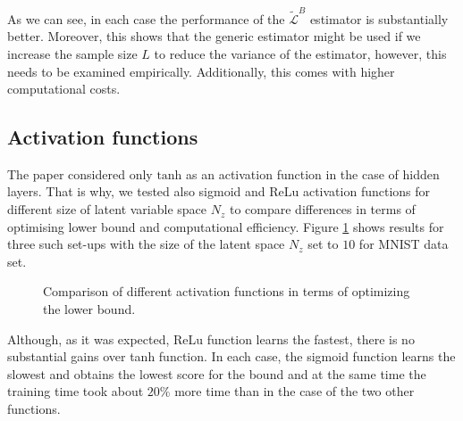 \documentclass[../report.tex]{subfiles}
\begin{document}
As we can see, in each case the performance of the $\widetilde{\mathcal{L}}^{B}$ estimator is substantially better. Moreover, this shows that the generic estimator might be used if we increase the sample size $L$ to reduce the variance of the estimator, however, this needs to be examined empirically. Additionally, this comes with higher computational costs.

\subsection{Activation functions}
The paper considered only $\text{tanh}$ as an activation function in the case of hidden layers. That is why, we tested also sigmoid and ReLu activation functions for different size of latent variable space $N_z$ to compare differences in terms of optimising lower bound and computational efficiency. Figure \ref{fig:mnist_activation} shows results for three such set-ups with the size of the latent space  $N_z$ set to $10$ for MNIST data set.

\begin{figure}[!htb]
\centering
  \caption[1]{Comparison of different activation functions in terms of optimizing the lower bound. }
\label{fig:mnist_activation}
\end{figure}

Although, as it was expected, ReLu function learns the fastest, there is no substantial gains over tanh function. In each case, the sigmoid function learns the slowest and obtains the lowest score for the bound and at the same time the training time took about $20\%$ more time than in the case of the two other functions.
\end{document}
